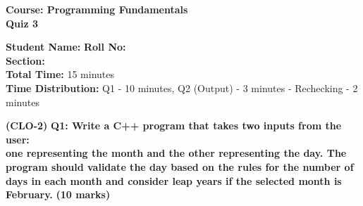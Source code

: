 \documentclass[a4paper,12pt]{article}
\newcommand{\studentinfo}{
    \textbf{Student Name:} \underline{\hspace{4cm}} \hspace{0.5cm}
    \textbf{Roll No:} \underline{\hspace{3cm}} \hspace{0.5cm} \\
    \textbf{Section:} \underline{\hspace{2cm}} \\
}
\begin{document}
\begin{center}
    {\large \textbf{Course: Programming Fundamentals}} \\
    \vspace{0.2cm}
    {\Large \textbf{Quiz 3}} \\
\end{center}

\vspace{0.5cm}

\studentinfo

\vspace{0.25cm}
\textbf{Total Time:} 15 minutes \\
\textbf{Time Distribution:} Q1 - 10 minutes, Q2 (Output) - 3 minutes - Rechecking - 2 minutes
\vspace{0.25cm}

 \textbf{(CLO-2)}
\textbf{Q1: Write a C++ program that takes two inputs from the user:        
\\one representing the month and the other representing the day. The program should validate the day based on the rules for the number of days in each month and consider leap years if the selected month is February.} \hfill 
\textbf{(10 marks)}  
\end{document}
